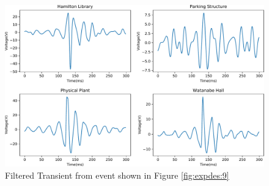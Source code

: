 \begin{figure}[h]
    \centering
    \includegraphics[width=1\linewidth]{img/deployment/gridwide_locality.pdf}
    \caption{Filtered Transient from event shown in Figure \ref{fig:expdes:9}}
    \label{expdes:fig:grid_wide_filtered}
\end{figure}

